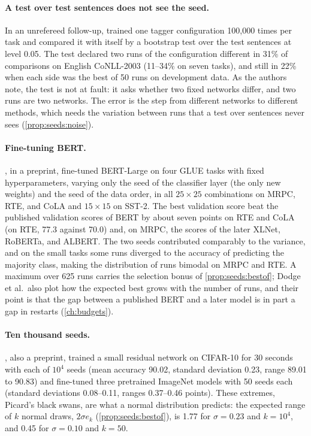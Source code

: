 \begin{refsection}
\paragraph{A test over test sentences does not see the seed.} In an unrefereed follow-up, \textcite{ReimersGurevych2018} trained one tagger configuration 100,000 times per task and compared it with itself by a bootstrap test over the test sentences at level 0.05. The test declared two runs of the configuration different in 31\% of comparisons on English CoNLL-2003 (11--34\% on seven tasks), and still in 22\% when each side was the best of 50 runs on development data. As the authors note, the test is not at fault: it asks whether two fixed networks differ, and two runs are two networks. The error is the step from different networks to different methods, which needs the variation between runs that a test over sentences never sees (\cref{prop:seeds:noise}).

\paragraph{Fine-tuning BERT.} \Textcite{DodgeEtAl2020}, in a preprint, fine-tuned BERT-Large on four GLUE tasks with fixed hyperparameters, varying only the seed of the classifier layer (the only new weights) and the seed of the data order, in all $25\times25$ combinations on MRPC, RTE, and CoLA and $15\times15$ on SST-2. The best validation score beat the published validation scores of BERT by about seven points on RTE and CoLA (on RTE, 77.3 against 70.0) and, on MRPC, the scores of the later XLNet, RoBERTa, and ALBERT. The two seeds contributed comparably to the variance, and on the small tasks some runs diverged to the accuracy of predicting the majority class, making the distribution of runs bimodal on MRPC and RTE. A maximum over 625 runs carries the selection bonus of \cref{prop:seeds:bestof}; Dodge et al.\ also plot how the expected best grows with the number of runs, and their point is that the gap between a published BERT and a later model is in part a gap in restarts (\cref{ch:budgets}).

\paragraph{Ten thousand seeds.} \Textcite{Picard2021}, also a preprint, trained a small residual network on CIFAR-10 for 30 seconds with each of $10^4$ seeds (mean accuracy 90.02, standard deviation 0.23, range 89.01 to 90.83) and fine-tuned three pretrained ImageNet models with 50 seeds each (standard deviations 0.08--0.11, ranges 0.37--0.46 points). These extremes, Picard's black swans, are what a normal distribution predicts: the expected range of $k$ normal draws, $2\sigma e_k$ (\cref{prop:seeds:bestof}), is 1.77 for $\sigma=0.23$ and $k=10^4$, and 0.45 for $\sigma=0.10$ and $k=50$.


\end{refsection}
